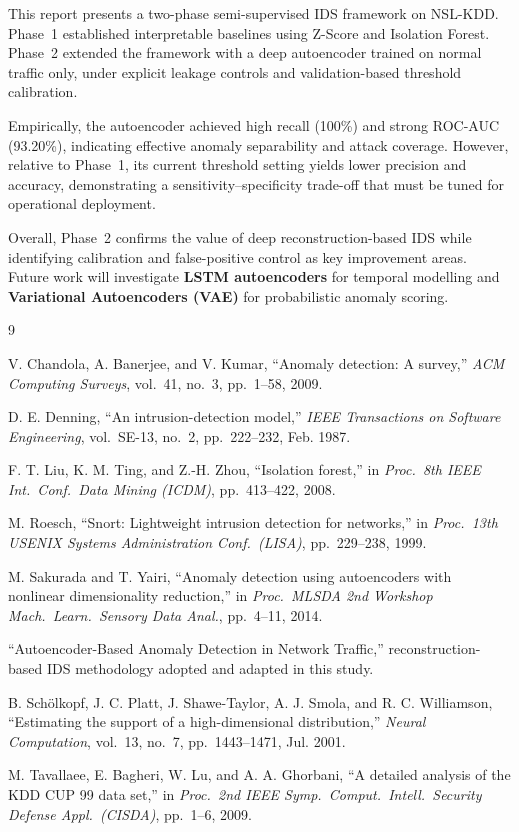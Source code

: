 \documentclass[conference]{IEEEtran}
\begin{document}
This report presents a two-phase semi-supervised IDS framework on NSL-KDD.
Phase~1 established interpretable baselines using Z-Score and Isolation Forest.
Phase~2 extended the framework with a deep autoencoder trained on normal traffic
only, under explicit leakage controls and validation-based threshold calibration.

Empirically, the autoencoder achieved high recall (100\%) and strong ROC-AUC
(93.20\%), indicating effective anomaly separability and attack coverage. However,
relative to Phase~1, its current threshold setting yields lower precision and
accuracy, demonstrating a sensitivity--specificity trade-off that must be tuned
for operational deployment.

Overall, Phase~2 confirms the value of deep reconstruction-based IDS while
identifying calibration and false-positive control as key improvement areas.
Future work will investigate \textbf{LSTM autoencoders} for temporal modelling
and \textbf{Variational Autoencoders (VAE)} for probabilistic anomaly scoring.

\begin{thebibliography}{9}

V. Chandola, A. Banerjee, and V. Kumar,
``Anomaly detection: A survey,''
\textit{ACM Computing Surveys}, vol.~41, no.~3, pp.~1--58, 2009.

D. E. Denning,
``An intrusion-detection model,''
\textit{IEEE Transactions on Software Engineering},
vol.~SE-13, no.~2, pp.~222--232, Feb. 1987.

F. T. Liu, K. M. Ting, and Z.-H. Zhou,
``Isolation forest,''
in \textit{Proc.\ 8th IEEE Int.\ Conf.\ Data Mining (ICDM)},
pp.~413--422, 2008.

M. Roesch,
``Snort: Lightweight intrusion detection for networks,''
in \textit{Proc.\ 13th USENIX Systems Administration Conf.\ (LISA)},
pp.~229--238, 1999.

M. Sakurada and T. Yairi,
``Anomaly detection using autoencoders with nonlinear dimensionality
reduction,''
in \textit{Proc.\ MLSDA 2nd Workshop Mach.\ Learn.\ Sensory Data Anal.},
pp.~4--11, 2014.

``Autoencoder-Based Anomaly Detection in Network Traffic,''
reconstruction-based IDS methodology adopted and adapted in this study.

B. Sch\"{o}lkopf, J. C. Platt, J. Shawe-Taylor, A. J. Smola, and R. C. Williamson,
``Estimating the support of a high-dimensional distribution,''
\textit{Neural Computation}, vol.~13, no.~7, pp.~1443--1471, Jul. 2001.

M. Tavallaee, E. Bagheri, W. Lu, and A. A. Ghorbani,
``A detailed analysis of the KDD CUP 99 data set,''
in \textit{Proc.\ 2nd IEEE Symp.\ Comput.\ Intell.\ Security Defense Appl.\
(CISDA)}, pp.~1--6, 2009.

\end{thebibliography}
\end{document}
